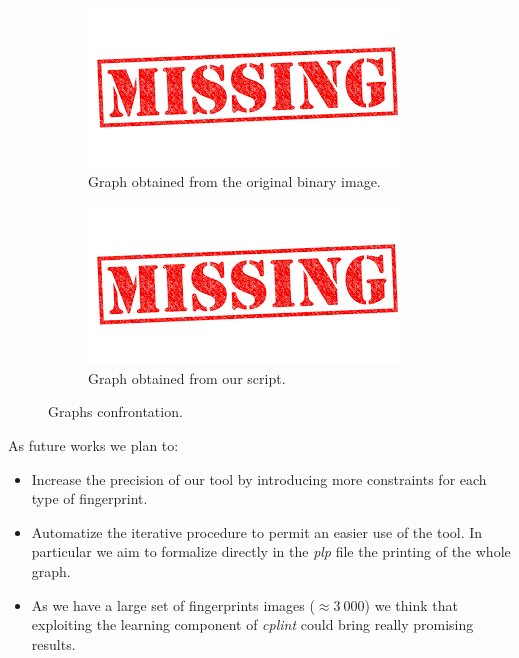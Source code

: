 \documentclass[8pt]{article}
\begin{document}
\begin{figure}
	\centering
	\begin{subfigure}{.48\textwidth}
		\centering
		\includegraphics[width=0.9\linewidth]{img/missing}
		\caption{Graph obtained from the original binary image.}
	\end{subfigure}%
	\hfill
	\begin{subfigure}{.48\textwidth}
		\centering
		\includegraphics[width=0.86\linewidth]{img/missing}
		\caption{Graph obtained from our script.}
	\end{subfigure}%
	\caption{Graphs confrontation.}
	\label{fig:concl}
\end{figure}

As future works we plan to:
\begin{itemize}
	\item Increase the precision of our tool by introducing more constraints for each 
        type of fingerprint.
	\item Automatize the iterative procedure to permit an easier use of the tool. 
        In particular we aim to formalize directly in the \textit{plp} file the printing 
        of the whole graph.
	\item As we have a large set of fingerprints images ($\approx 3\ 000$) we think that 
        exploiting the learning component of \textit{cplint} could bring really promising results.
\end{itemize}
\end{document}
